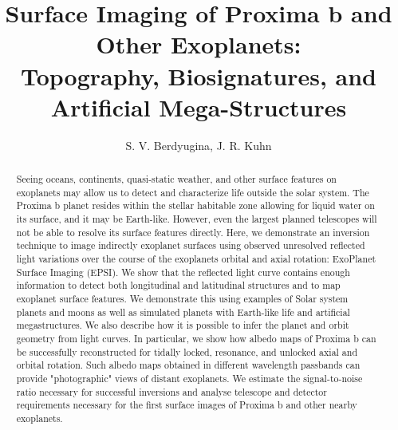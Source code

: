 \documentclass{emulateapj}
\begin{document}

\title{Surface Imaging of Proxima b and Other Exoplanets:\\
Topography, Biosignatures, and Artificial Mega-Structures}

\author{S. V. Berdyugina, 
J. R. Kuhn}



\begin{abstract}
Seeing oceans, continents, quasi-static weather, and other surface 
features on exoplanets may allow us to detect and characterize life outside the solar system.
The Proxima b planet resides within the stellar habitable zone 
allowing for liquid water on its surface, and it may be Earth-like.
However, even the largest planned telescopes will not be able to resolve its surface 
features directly.  
Here, we demonstrate an inversion technique to image indirectly exoplanet surfaces using
observed unresolved reflected  light variations over 
the course of the exoplanets orbital and axial rotation:
ExoPlanet Surface Imaging (EPSI).
We show that the reflected light curve contains enough information to detect both 
longitudinal and latitudinal structures and to map exoplanet surface features. 
We demonstrate this using examples of Solar system planets and moons as well as simulated planets 
with Earth-like life and artificial megastructures.
We also describe how it is possible to infer the planet and orbit geometry from  light curves.
In particular, we show how albedo maps of Proxima b can be successfully 
reconstructed for tidally locked, resonance, and unlocked axial and orbital rotation. 
Such albedo maps obtained in different wavelength passbands can provide
"photographic" views of distant exoplanets. We estimate the signal-to-noise ratio necessary
for successful inversions and analyse telescope and detector requirements necessary 
for the first surface images of Proxima b and other nearby exoplanets.  
\end{abstract}


\end{document}
